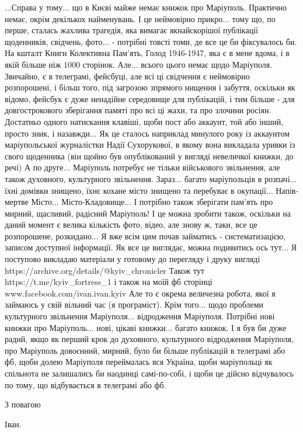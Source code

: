 ...Справа у тому... що в Києві майже немає книжок про Маріуполь.
Практично немає, окрім декількох найменувань. І це неймовірно прикро... тому
що, по перше, сталась жахлива трагедія, яка вимагає якнайскорішої публікації
щоденників, свідчень, фото... - потрібні товсті томи, де все це би фіксувалось
би. На кшталт Книги Колективна Пам'ять, Голод 1946-1947, яка є в мене вдома, і
в якій більше ніж 1000 сторінок.  Але... всього цього немає щодо Маріуполя.
Звичайно, є в телеграмі, фейсбуці, але всі ці свідчення є неймовірно
розпорошені, і більш того, під загрозою зпрямого нищення і забуття, оскільки як
відомо, фейсбук є дуже ненадійне середовище для публікацій, і тим більше - для
довгострокового зберігання памяті про всі ці жахи, та про злочини росіян.
Достатньо одного натискання клавіші, щоби пост або аккаунт, той або інший,
просто зник, і назавжди... Як це сталось наприклад минулого року із аккаунтом
маріупольської журналістки Надії Сухорукової, в якому вона викладала уривки із
свого щоденника (він щойно був опублікований у вигляді невеличкої книжки, до
речі) А по друге... Маріуполь потребує не тільки військового звільнення, але
також духовного, культурного звільнення. Зараз... багато маріупольців в
розпачі... їхні домівки знищено, їхнє кохане місто знищено та перебуває в
окупації... Напів-мертве Місто... Місто-Кладовище... І потрібно також зберігати
пам'ять про мирний, щасливий, радісний Маріуполь! І це можна зробити також,
оскільки на даний момент є велика кількість фото, відео, але знову ж, таки, все
це розпорошене, розкидано... Я вже всім цим почав займатись - систематизацією,
записом доступної інформації. Як все це виглядає, можна подивитись ось тут... Я
поступово викладаю матеріали у готовому до перегляду і друку вигляді
https://archive.org/details/@kyiv_chronicler  Також тут
https://t.me/kyiv_fortress_1 і також на моїй фб сторінці www.facebook.com/ivan.ivan.kyiv Але то є окрема
величезна робота, якої я займаюсь у свій вільний час (я програміст). Крім
того... щодо проблеми культурного звільнення Маріуполя... відродження
Маріуполя. Потрібні нові книжки про Маріуполь... нові, цікаві книжки... багато
книжок. І я був би дуже радий, якщо як перший крок до духовного, культурного відродження Маріуполя,
про Маріуполь довоєнний, мирний, було би більше публікацій в телеграмі або фб,
щоби долею Маріуполя переймалась вся Україна, щоби маріупольці як спільнота не залишались би наодинці самі-по-собі,
і щоби це дійсно відчувалось по тому, що відбувається
в телеграмі або фб.

З повагою

Іван.

